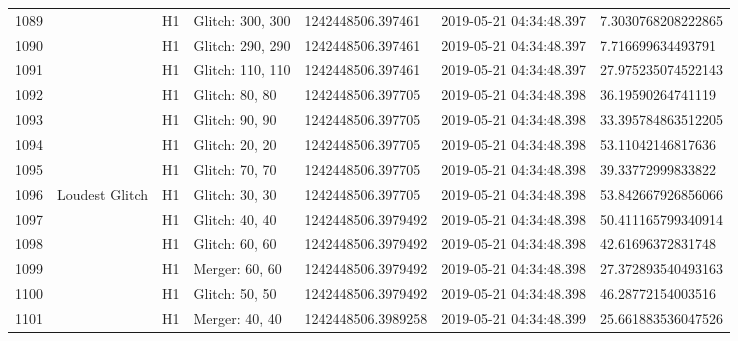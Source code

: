\begin{longtable}{lllllll}
1089 &                                                    &       H1 &  Glitch: 300, 300 &   1242448506.397461 &  2019-05-21 04:34:48.397 &  7.3030768208222865 \\
1090 &                                                    &       H1 &  Glitch: 290, 290 &   1242448506.397461 &  2019-05-21 04:34:48.397 &   7.716699634493791 \\
1091 &                                                    &       H1 &  Glitch: 110, 110 &   1242448506.397461 &  2019-05-21 04:34:48.397 &  27.975235074522143 \\
1092 &                                                    &       H1 &    Glitch: 80, 80 &   1242448506.397705 &  2019-05-21 04:34:48.398 &   36.19590264741119 \\
1093 &                                                    &       H1 &    Glitch: 90, 90 &   1242448506.397705 &  2019-05-21 04:34:48.398 &  33.395784863512205 \\
1094 &                                                    &       H1 &    Glitch: 20, 20 &   1242448506.397705 &  2019-05-21 04:34:48.398 &   53.11042146817636 \\
1095 &                                                    &       H1 &    Glitch: 70, 70 &   1242448506.397705 &  2019-05-21 04:34:48.398 &   39.33772999833822 \\
1096 &                                     Loudest Glitch &       H1 &    Glitch: 30, 30 &   1242448506.397705 &  2019-05-21 04:34:48.398 &  53.842667926856066 \\
1097 &                                                    &       H1 &    Glitch: 40, 40 &  1242448506.3979492 &  2019-05-21 04:34:48.398 &  50.411165799340914 \\
1098 &                                                    &       H1 &    Glitch: 60, 60 &  1242448506.3979492 &  2019-05-21 04:34:48.398 &   42.61696372831748 \\
1099 &                                                    &       H1 &    Merger: 60, 60 &  1242448506.3979492 &  2019-05-21 04:34:48.398 &  27.372893540493163 \\
1100 &                                                    &       H1 &    Glitch: 50, 50 &  1242448506.3979492 &  2019-05-21 04:34:48.398 &   46.28772154003516 \\
1101 &                                                    &       H1 &    Merger: 40, 40 &  1242448506.3989258 &  2019-05-21 04:34:48.399 &  25.661883536047526 \\

\end{longtable}
